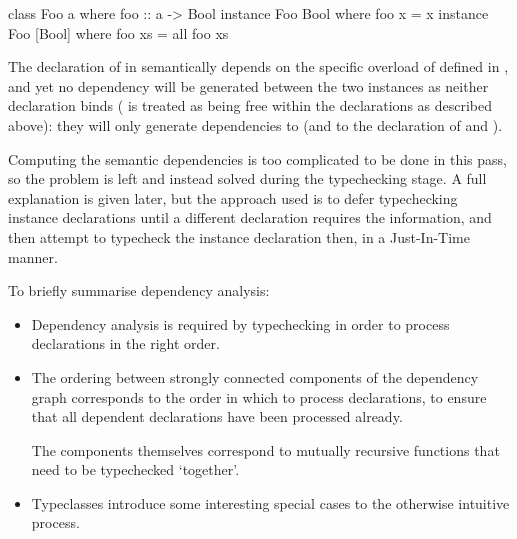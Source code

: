 \documentclass[dissertation.tex]{subfiles}
\begin{document}
{{\begin{itemize}
{            \begin{haskellfigure}
            class Foo a where
                foo :: a -> Bool
            instance Foo Bool where
                foo x = x
            instance Foo [Bool] where
                foo xs = all foo xs
            \end{haskellfigure}

            The declaration of  in  semantically depends on the specific overload of  defined in , and yet no dependency will be generated between the two instances as neither declaration binds  ( is treated as being free within the declarations as described above): they will only generate dependencies to  (and to the declaration of  and ).

            Computing the semantic dependencies is too complicated to be done in this pass, so the problem is left and instead solved during the typechecking stage. A full explanation is given later, but the approach used is to defer typechecking instance declarations until a different declaration requires the information, and then attempt to typecheck the instance declaration then, in a Just-In-Time manner.
        }
        \end{itemize}

        To briefly summarise dependency analysis:

        \begin{itemize}
        \item Dependency analysis is required by typechecking in order to process declarations in the right order.
        \item
        {
            The ordering between strongly connected components of the dependency graph corresponds to the order in which to process declarations, to ensure that all dependent declarations have been processed already.
            
            The components themselves correspond to mutually recursive functions that need to be typechecked `together'.
        }
        \item Typeclasses introduce some interesting special cases to the otherwise intuitive process.
        \end{itemize}
    }
}
\end{document}
